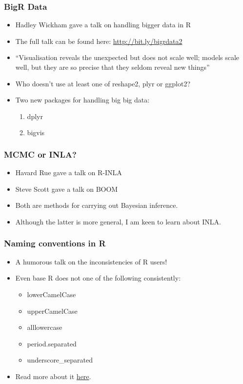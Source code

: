 \documentclass{beamer}
\begin{document}
\begin{frame}[label=current]
  \frametitle{BigR Data}
  \begin{itemize}
    \item Hadley Wickham gave a talk on handling bigger data in R
    \item The full talk can be found here: \url{http://bit.ly/bigrdata2}
    \item ``Visualisation reveals the unexpected but does not scale well; models
      scale well, but they are so precise that they seldom reveal new things''
    \item Who doesn't use at least one of reshape2, plyr or ggplot2?
    \item Two new packages for handling big big data:
      \begin{enumerate}
        \item dplyr
        \item bigvis
      \end{enumerate}
  \end{itemize}
\end{frame}

\begin{frame}
  \frametitle{MCMC or INLA?}
  \begin{itemize}
    \item Havard Rue gave a talk on R-INLA
    \item Steve Scott gave a talk on BOOM
    \item Both are methods for carrying out Bayesian inference.
    \item Although the latter is more general, I am keen to learn about INLA.
  \end{itemize}
\end{frame}

\begin{frame}
  \frametitle{Naming conventions in R}
  \begin{itemize}
    \item A humorous talk on the inconsistencies of R users!
    \item Even base R does not one of the following consistently:
      \begin{itemize}
      \item lowerCamelCase
      \item upperCamelCase
      \item alllowercase
      \item period.separated 
      \item underscore\_separated
      \end{itemize}
    \item Read more about it
\href{http://journal.r-project.org/archive/2012-2/RJournal_2012-2_Baaaath.pdf}
{here}.
  \end{itemize}
\end{frame}
\end{document}
